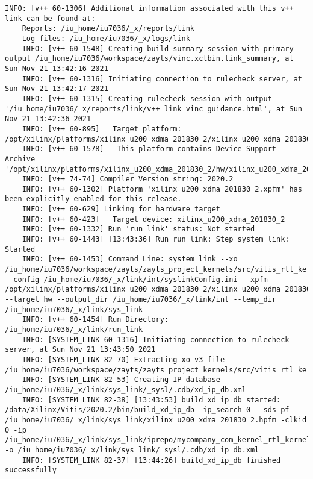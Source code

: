\begin{lstlisting}[caption=Содержимое файла v++\_vinc.log, label={log1}]
	INFO: [v++ 60-1306] Additional information associated with this v++ link can be found at:
	Reports: /iu_home/iu7036/_x/reports/link
	Log files: /iu_home/iu7036/_x/logs/link
	INFO: [v++ 60-1548] Creating build summary session with primary output /iu_home/iu7036/workspace/zayts/vinc.xclbin.link_summary, at Sun Nov 21 13:42:16 2021
	INFO: [v++ 60-1316] Initiating connection to rulecheck server, at Sun Nov 21 13:42:17 2021
	INFO: [v++ 60-1315] Creating rulecheck session with output '/iu_home/iu7036/_x/reports/link/v++_link_vinc_guidance.html', at Sun Nov 21 13:42:36 2021
	INFO: [v++ 60-895]   Target platform: /opt/xilinx/platforms/xilinx_u200_xdma_201830_2/xilinx_u200_xdma_201830_2.xpfm
	INFO: [v++ 60-1578]   This platform contains Device Support Archive '/opt/xilinx/platforms/xilinx_u200_xdma_201830_2/hw/xilinx_u200_xdma_201830_2.dsa'
	INFO: [v++ 74-74] Compiler Version string: 2020.2
	INFO: [v++ 60-1302] Platform 'xilinx_u200_xdma_201830_2.xpfm' has been explicitly enabled for this release.
	INFO: [v++ 60-629] Linking for hardware target
	INFO: [v++ 60-423]   Target device: xilinx_u200_xdma_201830_2
	INFO: [v++ 60-1332] Run 'run_link' status: Not started
	INFO: [v++ 60-1443] [13:43:36] Run run_link: Step system_link: Started
	INFO: [v++ 60-1453] Command Line: system_link --xo /iu_home/iu7036/workspace/zayts/zayts_project_kernels/src/vitis_rtl_kernel/rtl_kernel_wizard_2/rtl_kernel_wizard_2.xo --config /iu_home/iu7036/_x/link/int/syslinkConfig.ini --xpfm /opt/xilinx/platforms/xilinx_u200_xdma_201830_2/xilinx_u200_xdma_201830_2.xpfm --target hw --output_dir /iu_home/iu7036/_x/link/int --temp_dir /iu_home/iu7036/_x/link/sys_link
	INFO: [v++ 60-1454] Run Directory: /iu_home/iu7036/_x/link/run_link
	INFO: [SYSTEM_LINK 60-1316] Initiating connection to rulecheck server, at Sun Nov 21 13:43:50 2021
	INFO: [SYSTEM_LINK 82-70] Extracting xo v3 file /iu_home/iu7036/workspace/zayts/zayts_project_kernels/src/vitis_rtl_kernel/rtl_kernel_wizard_2/rtl_kernel_wizard_2.xo
	INFO: [SYSTEM_LINK 82-53] Creating IP database /iu_home/iu7036/_x/link/sys_link/_sysl/.cdb/xd_ip_db.xml
	INFO: [SYSTEM_LINK 82-38] [13:43:53] build_xd_ip_db started: /data/Xilinx/Vitis/2020.2/bin/build_xd_ip_db -ip_search 0  -sds-pf /iu_home/iu7036/_x/link/sys_link/xilinx_u200_xdma_201830_2.hpfm -clkid 0 -ip /iu_home/iu7036/_x/link/sys_link/iprepo/mycompany_com_kernel_rtl_kernel_wizard_2_1_0,rtl_kernel_wizard_2 -o /iu_home/iu7036/_x/link/sys_link/_sysl/.cdb/xd_ip_db.xml
	INFO: [SYSTEM_LINK 82-37] [13:44:26] build_xd_ip_db finished successfully

\end{lstlisting}
